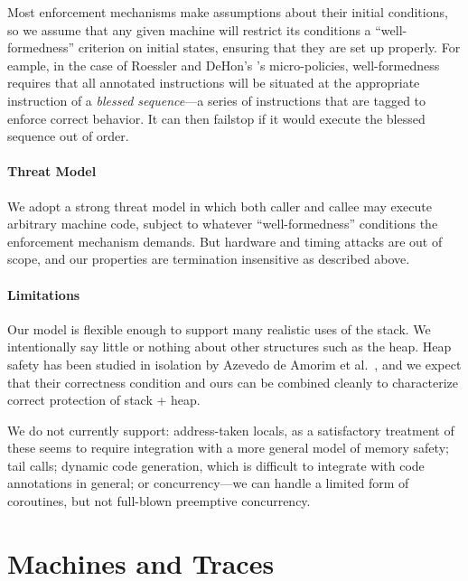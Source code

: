 \documentclass[10pt,conference]{ieeetran}%
\theoremstyle{definition}
\begin{document}
Most enforcement mechanisms make assumptions about their initial conditions,
so we assume that any given machine will restrict its conditions a ``well-formedness''
criterion on initial states, ensuring that they are set up properly. For eample, in the case of
Roessler and DeHon's \cite{DBLP:conf/sp/RoesslerD18}'s micro-policies, well-formedness
requires that all annotated instructions will be situated at the appropriate instruction
of a {\em blessed sequence}---a series of instructions that are tagged to enforce correct
behavior. It can then failstop if it would
execute the blessed sequence out of order.

\paragraph*{Threat Model}

We adopt a strong threat model in which both caller and callee may execute
arbitrary machine code, subject to whatever ``well-formedness'' conditions the
enforcement mechanism demands. But hardware and timing attacks are out of scope,
and our properties are termination insensitive as described above.

\paragraph*{Limitations}

Our model is flexible enough to support many realistic uses of the stack.
We intentionally say little or nothing about other structures
such as the heap.  Heap safety has been studied in isolation
by Azevedo de Amorim et al.~\cite{DBLP:conf/post/AmorimHP18}, and we expect that their correctness condition and ours can be
combined cleanly to characterize correct protection of stack + heap.

We do not currently support:
address-taken locals, as a satisfactory treatment of these seems to require
integration with a more general model of memory safety;
tail calls;
dynamic code generation, which is difficult to integrate with code annotations in general; or
concurrency---we can handle a limited form of coroutines, but
  not full-blown preemptive concurrency.

\section{Machines and Traces}
\label{sec:prelim}

\end{document}
